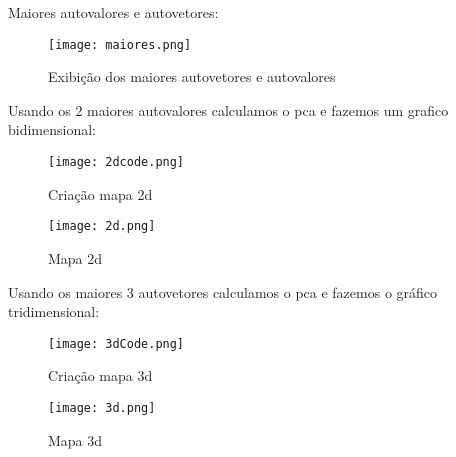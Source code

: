 \documentclass{article}
\begin{document}
Maiores autovalores e autovetores:

\begin{figure}[H]
    \centering
    \texttt{[image: maiores.png]}
    \caption{Exibição dos maiores autovetores e autovalores}
    \label{fig:autovalores}
\end{figure}

Usando os 2 maiores autovalores calculamos o pca e fazemos um grafico bidimensional:

\begin{figure}[H]
    \centering
    \texttt{[image: 2dcode.png]}
    \caption{Criação mapa 2d}
    \label{fig:autovalores}
\end{figure}

\begin{figure}[H]
    \centering
    \texttt{[image: 2d.png]}
    \caption{Mapa 2d}
    \label{fig:autovalores}
\end{figure}

Usando os maiores 3 autovetores calculamos o pca e fazemos o gráfico tridimensional: 

\begin{figure}[H]
    \centering
    \texttt{[image: 3dCode.png]}
    \caption{Criação mapa 3d}
    \label{fig:autovalores}
\end{figure}

\begin{figure}[H]
    \centering
    \texttt{[image: 3d.png]}
    \caption{Mapa 3d}
    \label{fig:autovalores}
\end{figure}
\end{document}
